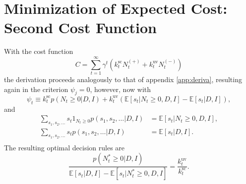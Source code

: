\section{Minimization of Expected Cost: Second Cost Function}
\label{app:deriv}
With the cost function
\begin{equation}
	C = \sum_{t=1}^{\infty}\gamma^{t}(k^\text{sc}_{t}N_{t}^{(+)}+k_{t}^\text{uv}N_{t}^{(-)})
\end{equation}
the derivation proceeds analogously to that of appendix \ref{app:deriva}, resulting again in the criterion $\psi_j=0$, however, now with
\begin{equation}
	\psi_t\equiv k^\text{sc}_{t}p(N_t\geq 0|D,I)+k_{t}^\text{uv}(\mathbb{E}[s_t|N_{t}\geq 0,D,I]-\mathbb{E}[s_t|D,I]),
\end{equation} 
and
\begin{equation}
	\begin{split}
		\sum_{s_1,s_2,\dots}s_{t}1_{N_{t}\geq 0}p(s_1,s_{2},\dots|D,I)&=\mathbb{E}[s_t|N_{t}\geq 0,D,I],\\
		\sum_{s_1,s_2,\dots}s_{t}p(s_1,s_{2},\dots|D,I)&=\mathbb{E}[s_t|D,I].\\
	\end{split}
\end{equation}
The resulting optimal decision rules are
\begin{equation}
	\frac{p(N_t^*\geq 0|D,I)}{\mathbb{E}[s_t|D,I]-\mathbb{E}[s_t|N_t^*\geq 0,D,I]}=\frac{k_{t}^\text{uv}}{k^\text{sc}_{t}}.
\end{equation}
